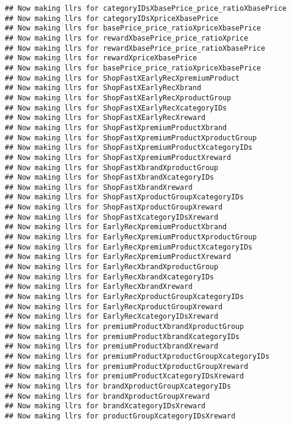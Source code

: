 \documentclass[10pt]{report}
\begin{document}
\begin{verbatim}
## Now making llrs for categoryIDsXbasePrice_price_ratioXbasePrice
## Now making llrs for categoryIDsXpriceXbasePrice
## Now making llrs for basePrice_price_ratioXpriceXbasePrice
## Now making llrs for rewardXbasePrice_price_ratioXprice
## Now making llrs for rewardXbasePrice_price_ratioXbasePrice
## Now making llrs for rewardXpriceXbasePrice
## Now making llrs for basePrice_price_ratioXpriceXbasePrice
## Now making llrs for ShopFastXEarlyRecXpremiumProduct
## Now making llrs for ShopFastXEarlyRecXbrand
## Now making llrs for ShopFastXEarlyRecXproductGroup
## Now making llrs for ShopFastXEarlyRecXcategoryIDs
## Now making llrs for ShopFastXEarlyRecXreward
## Now making llrs for ShopFastXpremiumProductXbrand
## Now making llrs for ShopFastXpremiumProductXproductGroup
## Now making llrs for ShopFastXpremiumProductXcategoryIDs
## Now making llrs for ShopFastXpremiumProductXreward
## Now making llrs for ShopFastXbrandXproductGroup
## Now making llrs for ShopFastXbrandXcategoryIDs
## Now making llrs for ShopFastXbrandXreward
## Now making llrs for ShopFastXproductGroupXcategoryIDs
## Now making llrs for ShopFastXproductGroupXreward
## Now making llrs for ShopFastXcategoryIDsXreward
## Now making llrs for EarlyRecXpremiumProductXbrand
## Now making llrs for EarlyRecXpremiumProductXproductGroup
## Now making llrs for EarlyRecXpremiumProductXcategoryIDs
## Now making llrs for EarlyRecXpremiumProductXreward
## Now making llrs for EarlyRecXbrandXproductGroup
## Now making llrs for EarlyRecXbrandXcategoryIDs
## Now making llrs for EarlyRecXbrandXreward
## Now making llrs for EarlyRecXproductGroupXcategoryIDs
## Now making llrs for EarlyRecXproductGroupXreward
## Now making llrs for EarlyRecXcategoryIDsXreward
## Now making llrs for premiumProductXbrandXproductGroup
## Now making llrs for premiumProductXbrandXcategoryIDs
## Now making llrs for premiumProductXbrandXreward
## Now making llrs for premiumProductXproductGroupXcategoryIDs
## Now making llrs for premiumProductXproductGroupXreward
## Now making llrs for premiumProductXcategoryIDsXreward
## Now making llrs for brandXproductGroupXcategoryIDs
## Now making llrs for brandXproductGroupXreward
## Now making llrs for brandXcategoryIDsXreward
## Now making llrs for productGroupXcategoryIDsXreward
\end{verbatim}
\end{document}
